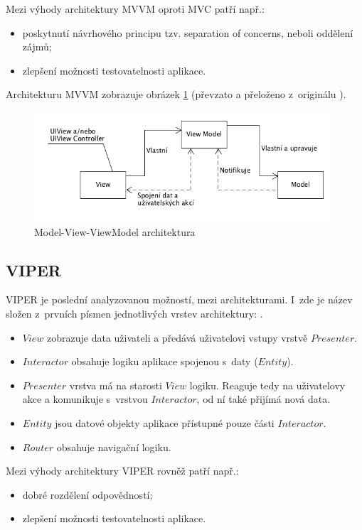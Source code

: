 \documentclass[thesis=M,czech]{FITthesis}[2012/06/26]
\begin{document}
Mezi výhody architektury MVVM oproti MVC patří např.:
\begin{itemize}
\item poskytnutí návrhového principu tzv. separation of concerns, neboli oddělení zájmů;
\item zlepšení možnosti testovatelnosti aplikace.
\end{itemize}

Architekturu MVVM zobrazuje obrázek \ref{fig:mvvm} (převzato a přeloženo z~originálu \cite{mvvm-pic}).

\begin{figure}[h]\centering
 \includegraphics[width=0.99\textwidth]{./pictures/architektury/MVVM}
 \caption[Model-View-ViewModel architektura]{Model-View-ViewModel architektura}\label{fig:mvvm}
\end{figure}

\subsection{VIPER}
VIPER je poslední analyzovanou možností, mezi architekturami. I~zde je název složen z~prvních písmen jednotlivých vrstev architektury: .
\begin{itemize}
\item $View$  zobrazuje data uživateli a předává uživatelovi vstupy vrstvě $Presenter$.
\item $Interactor$ obsahuje logiku aplikace spojenou s~daty ($Entity$).
\item $Presenter$ vrstva má na starosti $View$ logiku. Reaguje tedy na uživatelovy akce a komunikuje s~vrstvou $Interactor$, od ní také přijímá nová data. \cite{Orlov}
\item $Entity$ jsou datové objekty aplikace přístupné pouze části $Interactor$.
\item $Router$ obsahuje navigační logiku. \cite{VIPER}
\end{itemize}

Mezi výhody architektury VIPER rovněž patří např.:
\begin{itemize}
\item dobré rozdělení odpovědností;
\item zlepšení možnosti testovatelnosti aplikace. \cite{Orlov}
\end{itemize}
\end{document}
